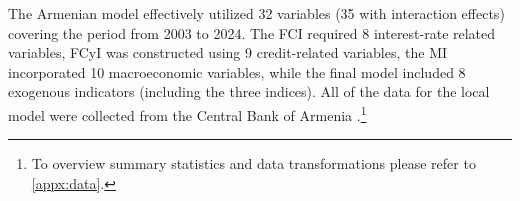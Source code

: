 The Armenian model effectively utilized 32 variables (35 with interaction effects) covering the period from 2003 to 2024. The FCI required 8 interest-rate related variables, FCyI was constructed using 9 credit-related variables, the MI incorporated 10 macroeconomic variables, while the final model included 8 exogenous indicators (including the three indices). All of the data for the local model were collected from the Central Bank of Armenia \citep{cba2024}.\footnote{To overview summary statistics and data transformations please refer to \ref{appx:data}.}